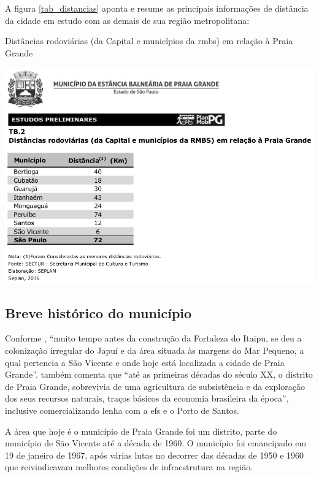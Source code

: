 	A figura \ref{tab_distancias} aponta e resume as principais informações de distância da cidade em estudo com as demais de sua região metropolitana:
	
	\begin{table}[!htb]
		\centering
		\caption{Distâncias rodoviárias (da Capital e municípios da \gls{rmbs}) em relação à Praia Grande}
		\includegraphics[width=1\textwidth]{img/TB_2_DISTANCIAS_RODOVIARIAS.png}
		\label{tab_distancias}
	\end{table}
		
	\subsection{Breve histórico do município}
	
	Conforme , ``muito tempo antes da construção da Fortaleza do Itaipu, se deu a colonização irregular do Japuí e da área situada às margens do Mar Pequeno, a qual pertencia a São Vicente e onde hoje está localizada a cidade de Praia	Grande''.  também comenta que ``até as primeiras décadas do século XX, o distrito de Praia Grande, sobrevivia de uma agricultura de subsistência e da exploração dos seus recursos naturais, traços básicos da economia brasileira da época'', inclusive comercializando lenha com a \gls{efs} e o Porto de Santos.

	A área que hoje é o município de Praia Grande foi um distrito, parte do município de São Vicente até a década de 1960. O município foi emancipado em 19 de janeiro de 1967, após várias lutas no decorrer das décadas de 1950 e 1960 que reivindicavam melhores condições de infraestrutura na região.
	
